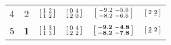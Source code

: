 \begin{table}[hbt!]
\begin{tabular}{cccccc}
        4 & 2 & $\begin{bsmallmatrix} 1 & 2 \\ 1 & 2 \end{bsmallmatrix}$ & $\begin{bsmallmatrix} 0 & 4 \\ 2 & 0 \end{bsmallmatrix}$ & $\begin{bsmallmatrix} -9.2 & -5.6 \\ -8.2 & -6.6 \end{bsmallmatrix}$ & $\begin{bsmallmatrix} 2 & \underline{2} \end{bsmallmatrix}$ \\

        5 & \bf{1} & $\begin{bsmallmatrix} 1 & 3 \\ 1 & 3 \end{bsmallmatrix}$ & $\begin{bsmallmatrix} 0 & 4 \\ 2 & 2 \end{bsmallmatrix}$ & $\begin{bsmallmatrix} \bf{-9.2} & \bf{-4.8} \\ \bf{-8.2} & \bf{-7.8} \end{bsmallmatrix}$ & $\begin{bsmallmatrix} \underline{2} & 2 \end{bsmallmatrix}$ \\
        
        \bottomrule
      \end{tabular}
\end{table}
